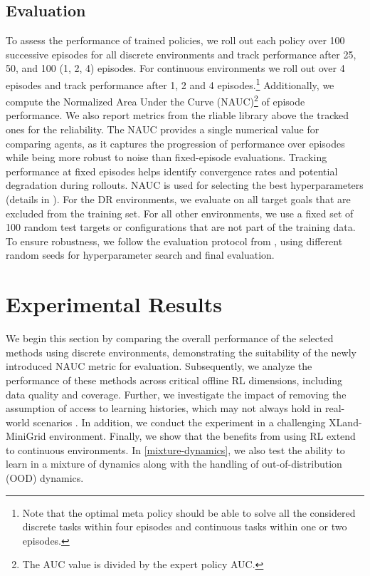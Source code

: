 \documentclass{article}
\begin{document}
\subsection{Evaluation}
\label{sub:eval}
To assess the performance of trained policies, we roll out each policy over 100 successive episodes for all discrete environments and track performance after 25, 50, and 100 (1, 2, 4) episodes. For continuous environments we roll out over 4 episodes and track performance after 1, 2 and 4 episodes.\footnote{Note that the optimal meta policy should be able to solve all the considered discrete tasks within four episodes and continuous tasks within one or two episodes.} Additionally, we compute the Normalized Area Under the Curve (NAUC)\footnote{The AUC value is divided by the expert policy AUC.} of episode performance. We also report metrics from the rliable library \citep{agarwal2021deep} above the tracked ones for the reliability.
The NAUC provides a single numerical value for comparing agents, as it captures the progression of performance over episodes while being more robust to noise than fixed-episode evaluations. Tracking performance at fixed episodes helps identify convergence rates and potential degradation during rollouts. NAUC is used for selecting the best hyperparameters (details in ).
For the DR environments, we evaluate on all target goals that are excluded from the training set. For all other environments, we use a fixed set of 100 random test targets or configurations that are not part of the training data. To ensure robustness, we follow the evaluation protocol from \citet{tarasov2024revisiting}, using different random seeds for hyperparameter search and final evaluation.
\section{Experimental Results}
We begin this section by comparing the overall performance of the selected methods using discrete environments, demonstrating the suitability of the newly introduced NAUC metric for evaluation. Subsequently, we analyze the performance of these methods across critical offline RL dimensions, including data quality and coverage. Further, we investigate the impact of removing the assumption of access to learning histories, which may not always hold in real-world scenarios \citep{zisman2023emergence}. In addition, we conduct the experiment in a challenging XLand-MiniGrid \citep{nikulin2023xland} environment. Finally, we show that the benefits from using RL extend to continuous environments. In \autoref{mixture-dynamics}, we also test the ability to learn in a mixture of dynamics along with the handling of out-of-distribution (OOD) dynamics.
\end{document}

